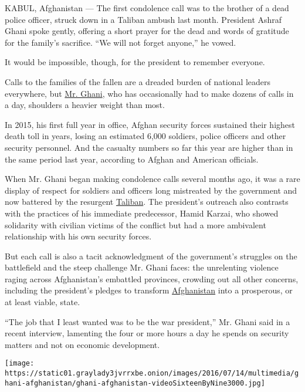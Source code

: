 KABUL, Afghanistan --- The first condolence call was to the brother of a
dead police officer, struck down in a Taliban ambush last month.
President Ashraf Ghani spoke gently, offering a short prayer for the
dead and words of gratitude for the family's sacrifice. ``We will not
forget anyone,'' he vowed.

It would be impossible, though, for the president to remember everyone.

Calls to the families of the fallen are a dreaded burden of national
leaders everywhere, but
\href{http://topics.nytimes3xbfgragh.onion/top/reference/timestopics/people/g/ashraf_ghani/index.html}{Mr.
Ghani}, who has occasionally had to make dozens of calls in a day,
shoulders a heavier weight than most.

In 2015, his first full year in office, Afghan security forces sustained
their highest death toll in years, losing an estimated 6,000 soldiers,
police officers and other security personnel. And the casualty numbers
so far this year are higher than in the same period last year, according
to Afghan and American officials.

When Mr. Ghani began making condolence calls several months ago, it was
a rare display of respect for soldiers and officers long mistreated by
the government and now battered by the resurgent
\href{https://www.nytimes3xbfgragh.onion/topic/organization/taliban}{Taliban}.
The president's outreach also contrasts with the practices of his
immediate predecessor, Hamid Karzai, who showed solidarity with civilian
victims of the conflict but had a more ambivalent relationship with his
own security forces.

But each call is also a tacit acknowledgment of the government's
struggles on the battlefield and the steep challenge Mr. Ghani faces:
the unrelenting violence raging across Afghanistan's embattled
provinces, crowding out all other concerns, including the president's
pledges to transform
\href{https://www.nytimes3xbfgragh.onion/topic/destination/afghanistan}{Afghanistan}
into a prosperous, or at least viable, state.

``The job that I least wanted was to be the war president,'' Mr. Ghani
said in a recent interview, lamenting the four or more hours a day he
spends on security matters and not on economic development.

\texttt{[image: https://static01.graylady3jvrrxbe.onion/images/2016/07/14/multimedia/ghani-afghanistan/ghani-afghanistan-videoSixteenByNine3000.jpg]}

